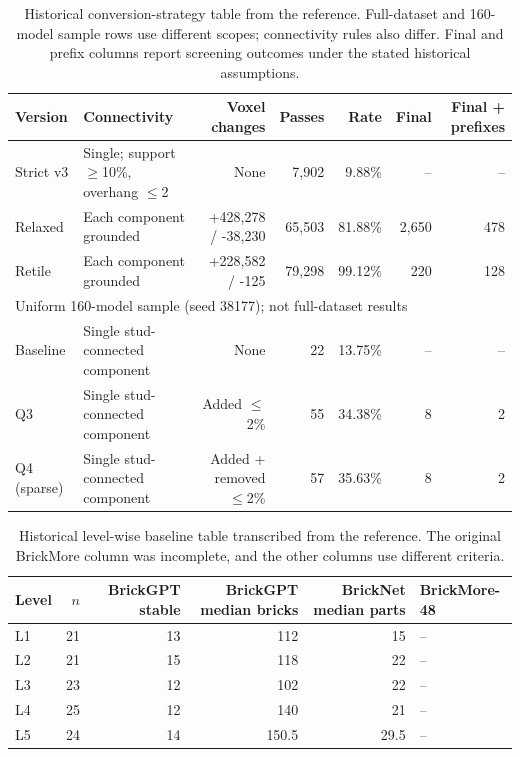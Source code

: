 \begin{table}[t]\centering\scriptsize
\begin{tabular}{llrrrrr}\toprule
Version & Connectivity & Voxel changes & Passes & Rate & Final & Final + prefixes \\ \midrule
Strict v3 & Single; support $\geq$10\%, overhang $\leq$2 & None & 7,902 & 9.88\% & -- & -- \\
Relaxed & Each component grounded & +428,278 / -38,230 & 65,503 & 81.88\% & 2,650 & 478 \\
Retile & Each component grounded & +228,582 / -125 & 79,298 & 99.12\% & 220 & 128 \\
\midrule
\multicolumn{7}{l}{Uniform 160-model sample (seed 38177); not full-dataset results} \\
Baseline & Single stud-connected component & None & 22 & 13.75\% & -- & -- \\
Q3 & Single stud-connected component & Added $\leq$2\% & 55 & 34.38\% & 8 & 2 \\
Q4 (sparse) & Single stud-connected component & Added + removed $\leq$2\% & 57 & 35.63\% & 8 & 2 \\
\bottomrule\end{tabular}
\caption{Historical conversion-strategy table from the reference. Full-dataset and 160-model sample rows use different scopes; connectivity rules also differ. Final and prefix columns report screening outcomes under the stated historical assumptions.}
\end{table}

\begin{table}[t]\centering\scriptsize
\begin{tabular}{lrrrrl}\toprule
Level & $n$ & BrickGPT stable & BrickGPT median bricks & BrickNet median parts & BrickMore-48 \\ \midrule
L1 & 21 & 13 & 112 & 15 & -- \\
L2 & 21 & 15 & 118 & 22 & -- \\
L3 & 23 & 12 & 102 & 22 & -- \\
L4 & 25 & 12 & 140 & 21 & -- \\
L5 & 24 & 14 & 150.5 & 29.5 & -- \\
\bottomrule\end{tabular}
\caption{Historical level-wise baseline table transcribed from the reference. The original BrickMore column was incomplete, and the other columns use different criteria.}
\end{table}

